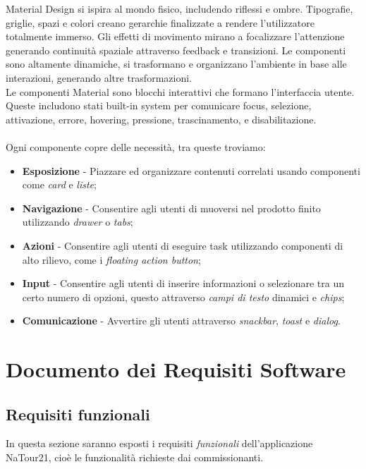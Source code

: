 \documentclass{natourDoc}
\begin{document}
Material Design si ispira al mondo fisico, includendo riflessi e ombre. Tipografie, griglie, spazi e colori creano gerarchie finalizzate a rendere l'utilizzatore totalmente immerso.
Gli effetti di movimento mirano a focalizzare l'attenzione generando continuità spaziale attraverso feedback e transizioni.
Le componenti sono altamente dinamiche, si trasformano e organizzano l'ambiente in base alle interazioni, generando altre trasformazioni.\\
Le componenti Material sono blocchi interattivi che formano l'interfaccia utente.
Queste includono stati built-in system per comunicare focus, selezione, attivazione, errore, hovering, pressione, trascinamento, e disabilitazione. \\\\
Ogni componente copre delle necessità, tra queste troviamo:
\begin{itemize}
	\item \textbf{Esposizione} - Piazzare ed organizzare contenuti correlati usando componenti come \textit{card} e \textit{liste};
	\item \textbf{Navigazione} - Consentire agli utenti di muoversi nel prodotto finito utilizzando \textit{drawer} o \textit{tabs};
	\item \textbf{Azioni} - Consentire agli utenti di eseguire task utilizzando componenti di alto rilievo, come i \textit{floating action button};
	\item \textbf{Input} - Consentire agli utenti di inserire informazioni o selezionare tra un certo numero di opzioni, questo attraverso \textit{campi di testo} dinamici e \textit{chips};
	\item \textbf{Comunicazione} - Avvertire gli utenti attraverso \textit{snackbar}, \textit{toast} e \textit{dialog}.
\end{itemize}


\newpage
\section{Documento dei Requisiti Software}
\subsection{Requisiti funzionali}
In questa sezione saranno esposti i requisiti \textit{funzionali} dell'applicazione NaTour21, cioè le funzionalità richieste dai commissionanti.
\end{document}
